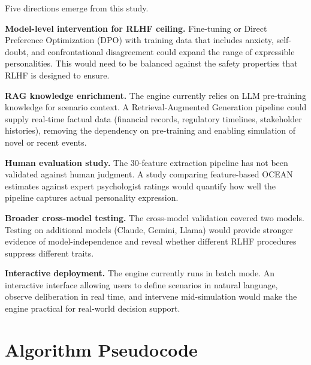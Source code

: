 \documentclass[12pt, a4paper]{report}
\begin{document}
Five directions emerge from this study.

\textbf{Model-level intervention for RLHF ceiling.} Fine-tuning or Direct Preference Optimization (DPO) with training data that includes anxiety, self-doubt, and confrontational disagreement could expand the range of expressible personalities. This would need to be balanced against the safety properties that RLHF is designed to ensure.

\textbf{RAG knowledge enrichment.} The engine currently relies on LLM pre-training knowledge for scenario context. A Retrieval-Augmented Generation pipeline could supply real-time factual data (financial records, regulatory timelines, stakeholder histories), removing the dependency on pre-training and enabling simulation of novel or recent events.

\textbf{Human evaluation study.} The 30-feature extraction pipeline has not been validated against human judgment. A study comparing feature-based OCEAN estimates against expert psychologist ratings would quantify how well the pipeline captures actual personality expression.

\textbf{Broader cross-model testing.} The cross-model validation covered two models. Testing on additional models (Claude, Gemini, Llama) would provide stronger evidence of model-independence and reveal whether different RLHF procedures suppress different traits.

\textbf{Interactive deployment.} The engine currently runs in batch mode. An interactive interface allowing users to define scenarios in natural language, observe deliberation in real time, and intervene mid-simulation would make the engine practical for real-world decision support.


\renewcommand{\bibname}{Bibliography}



\appendix

\chapter{Algorithm Pseudocode}
\label{app:main_loop}
\end{document}
